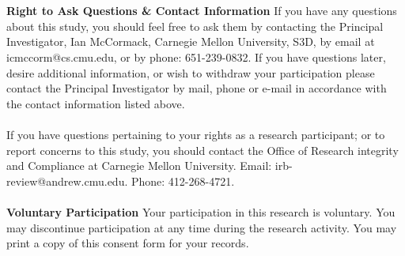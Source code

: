 \\\\
\noindent\textbf{Right to Ask Questions \& Contact Information}
If you have any questions about this study, you should feel free to ask them by contacting the Principal Investigator, Ian McCormack, Carnegie Mellon University, S3D, by email at icmccorm@cs.cmu.edu, or by phone: 651-239-0832. If you have questions later, desire additional information, or wish to withdraw your participation please contact the Principal Investigator by mail, phone or e-mail in accordance with the contact information listed above.
\\\\
If you have questions pertaining to your rights as a research participant; or to report concerns to this study, you should contact the Office of Research integrity and Compliance at Carnegie Mellon University. Email: irb-review@andrew.cmu.edu. Phone: 412-268-4721.
\\\\
\noindent\textbf{Voluntary Participation}
Your participation in this research is voluntary. You may discontinue participation at any time during the research activity. You may print a copy of this consent form for your records.



